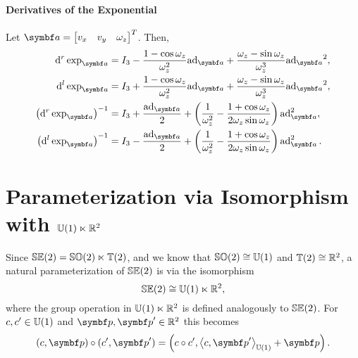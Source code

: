 \begin{properties}[breakable, title={$\SEtwo$ formula sheet}]
  \paragraph{Derivatives of the Exponential} Let $\a =\begin{bmatrix} v_x & v_y & \omega_z \end{bmatrix}^T$. Then,
  \begin{align}
    \mathrm{d}^r \exp_{\a}                     & =        I_3 - \frac{1 - \cos \omega_z}{\omega_z^2} {\ad_\a} + \frac{ \omega_z - \sin \omega_z }{\omega_z^3} {\ad_\a}^2,       \\
    \mathrm{d}^l \exp_{\a}                     & = I_3 + \frac{1 - \cos \omega_z}{\omega_z^2} {\ad_\a} + \frac{ \omega_z - \sin \omega_z }{\omega_z^3} {\ad_\a}^2,              \\
    \left( \mathrm{d}^r \exp_{\a} \right)^{-1} & = I_3 + \frac{\ad_\a}{2} + \left( \frac{1}{\omega_z^2} - \frac{1 + \cos \omega_z }{2 \omega_z \sin \omega_z} \right) \ad_\a^2, \\
    \left( \mathrm{d}^l \exp_{\a} \right)^{-1} & = I_3 - \frac{\ad_\a}{2} + \left( \frac{1}{\omega_z^2} - \frac{1 + \cos \omega_z }{2 \omega_z \sin \omega_z} \right) \ad_\a^2.
  \end{align}
\end{properties}

\section{Parameterization via Isomorphism with \texorpdfstring{${\mathbb{U}(1)} \ltimes \mathbb{R}^{2}$}{U(1) |x R2}}

Since ${\mathbb{SE}(2)} = {\mathbb{SO}(2)} \ltimes {\mathbb{T}(2)}$, and we know that ${\mathbb{SO}(2)} \cong {\mathbb{U}(1)}$ and ${\mathbb{T}(2)} \cong \mathbb{R}^2$, a natural parameterization of $\SEtwo$ is via the isomorphism
\begin{equation}
  {\mathbb{SE}(2)} \cong {\mathbb{U}(1)} \ltimes \mathbb{R}^2,
\end{equation}
where the group operation in ${\mathbb{U}(1)} \ltimes \mathbb{R}^2$ is defined analogously to $\SEtwo$. For $c, c' \in {\mathbb{U}(1)}$ and $\bp, \bp' \in \mathbb{R}^2$ this becomes
\begin{equation}
  \label{eq:u1_r2_action}
  (c, \bp) \circ (c', \bp') = \left( c \circ c', \left \langle c, \bp' \right \rangle_\Uone + \bp \right).
\end{equation}


